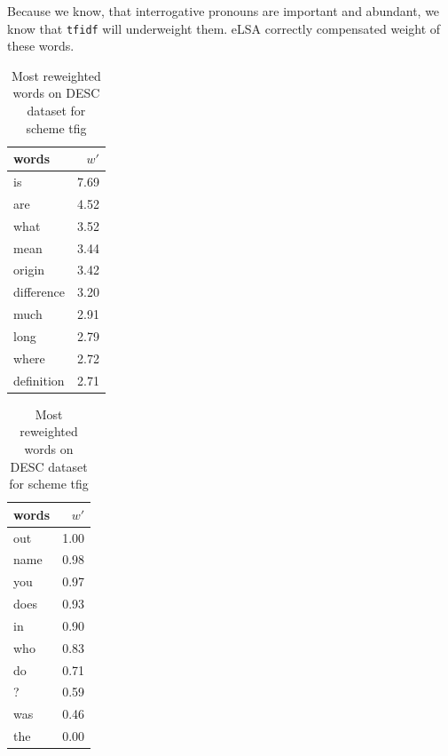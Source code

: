     Because we know, that interrogative pronouns are important and abundant, we know that \texttt{tfidf} will underweight them.
    eLSA correctly compensated weight of these words.
    
    

\begin{table}[H]
    \centering
    \begin{minipage}{.4\linewidth}
      \centering
        \begin{tabular}{lr}
\toprule
      words &  $w'$ \\
\midrule
         is &  7.69 \\
        are &  4.52 \\
       what &  3.52 \\
       mean &  3.44 \\
     origin &  3.42 \\
 difference &  3.20 \\
       much &  2.91 \\
       long &  2.79 \\
      where &  2.72 \\
 definition &  2.71 \\
\bottomrule
\end{tabular}

    \end{minipage}
    \begin{minipage}{.4\linewidth}
      \centering
        \begin{tabular}{lr}
\toprule
words &  $w'$ \\
\midrule
  out &  1.00 \\
 name &  0.98 \\
  you &  0.97 \\
 does &  0.93 \\
   in &  0.90 \\
  who &  0.83 \\
   do &  0.71 \\
    ? &  0.59 \\
  was &  0.46 \\
  the &  0.00 \\
\bottomrule
\end{tabular}

    \end{minipage} 
    \caption{Most reweighted words on DESC dataset for scheme tfig}
    \label{tab:words:TREC:tfig}
\end{table}

